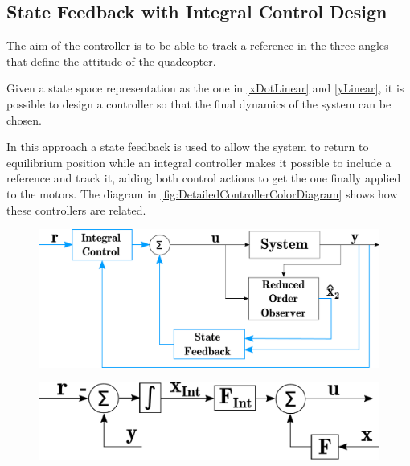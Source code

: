 \subsection{State Feedback with Integral Control Design}
The aim of the controller is to be able to track a reference in the three angles that define the attitude of the quadcopter.

Given a state space representation as the one in \autoref{xDotLinear} and \ref{yLinear}, it is possible to design a controller so that the final dynamics of the system can be chosen.

In this approach a state feedback is used to allow the system to return to equilibrium position while an integral controller makes it possible to include a reference and track it, adding both control actions to get the one finally applied to the motors. The diagram in \autoref{fig:DetailedControllerColorDiagram} shows how these controllers are related.
%
\begin{minipage}{\linewidth}
	\begin{minipage}{0.6\linewidth}
		\begin{figure}[H]
			\includegraphics[scale=.35]{figures/ControllerColorDiagram}
			\centering			
			\label{fig:ControllerColorDiagram}
		\end{figure}
	\end{minipage}
	\hspace{0.03\linewidth}
	\begin{minipage}{0.4\linewidth}
		\begin{figure}[H]\vspace{20mm}
			\includegraphics[scale=.35]{figures/DetailedControllerColorDiagram}
			\centering \vspace{7mm}
			\label{fig:DetailedControllerColorDiagram}
		\end{figure}
	\end{minipage}
\end{minipage}


